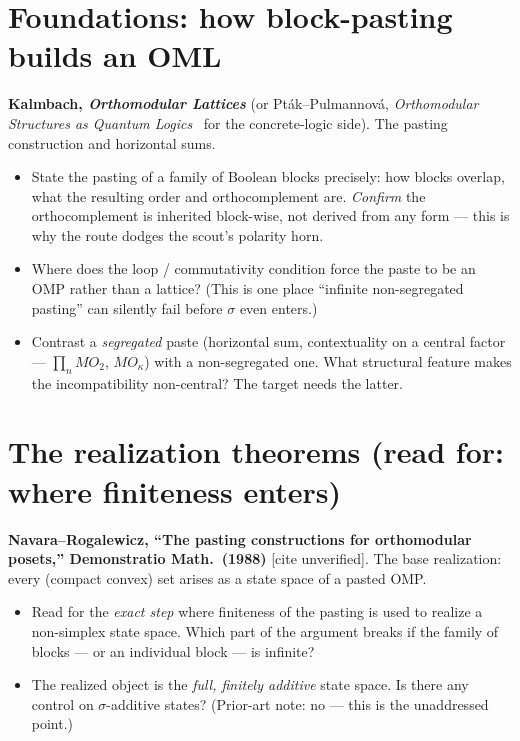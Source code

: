 \documentclass[11pt]{article}
\begin{document}
\section{Foundations: how block-pasting builds an OML}

\noindent\textbf{Kalmbach, \emph{Orthomodular Lattices}} (or Pt\'ak--Pulmannov\'a,
\emph{Orthomodular Structures as Quantum Logics}~\cite{PtakPulmannova1991} for the
concrete-logic side). The pasting construction and horizontal sums.
\begin{itemize}[leftmargin=*]
  \item State the pasting of a family of Boolean blocks precisely: how blocks overlap,
    what the resulting order and orthocomplement are. \emph{Confirm} the orthocomplement
    is inherited block-wise, not derived from any form --- this is why the route dodges
    the scout's polarity horn.
  \item Where does the loop / commutativity condition force the paste to be an OMP
    rather than a lattice? (This is one place ``infinite non-segregated pasting'' can
    silently fail before $\sigma$ even enters.)
  \item Contrast a \emph{segregated} paste (horizontal sum, contextuality on a central
    factor --- $\prod_n MO_2$, $MO_\kappa$) with a non-segregated one. What structural
    feature makes the incompatibility non-central? The target needs the latter.
\end{itemize}

\section{The realization theorems (read for: where finiteness enters)}

\noindent\textbf{Navara--Rogalewicz, ``The pasting constructions for orthomodular
posets,'' Demonstratio Math.\ (1988)} \textup{[cite unverified]}. The base realization:
every (compact convex) set arises as a state space of a pasted OMP.
\begin{itemize}[leftmargin=*]
  \item Read for the \emph{exact step} where finiteness of the pasting is used to realize
    a non-simplex state space. Which part of the argument breaks if the family of blocks
    --- or an individual block --- is infinite?
  \item The realized object is the \emph{full, finitely additive} state space. Is there
    any control on $\sigma$-additive states? (Prior-art note: no --- this is the
    unaddressed point.)
\end{itemize}
\end{document}

